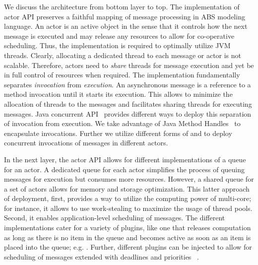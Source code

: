 We discuss the architecture from bottom layer to top.
The implementation of actor API preserves a faithful mapping of message processing in ABS modeling language.
An actor is an active object in the sense that it controls how the next message is executed and may release any resources to allow for co-operative scheduling.
Thus, the implementation is required to optimally utilize JVM threads.
Clearly, allocating a dedicated thread to each message or actor is not scalable.
Therefore, actors need to \emph{share} threads for message execution and yet be in full control of resources when required.
The implementation fundamentally separates \emph{invocation} from \emph{execution}.
An asynchronous message is a reference to a method invocation until it starts its execution.
This allows to minimize the allocation of threads to the messages and facilitates sharing threads for executing messages.
Java concurrent API~\cite{jsr166} provides different ways to deploy this separation of invocation from execution.
We take advantage of Java Method Handles~\cite{jsr292:invokedyn} to encapsulate invocations.
Further we utilize different forms of  and  to deploy concurrent invocations of messages in different actors.

In the next layer, the actor API allows for different implementations of a queue for an actor.
A dedicated queue for each actor simplifies the process of queuing messages for execution but consumes more resources.
However, a  shared queue for a set of actors allows for memory and storage optimization.
This latter approach of deployment, first, provides a way to utilize the computing power of multi-core; 
for instance, it allows to use work-stealing to maximize the usage of thread pools.
Second, it enables  application-level scheduling of messages.
The different implementations cater for a variety of plugins, like
one that releases computation as long as there is no item
in the queue and becomes active as soon as an item is placed into the queue; e.g. .
Further, different plugins can be injected to allow for scheduling of messages extended with deadlines and priorities
~\cite{Nobakht:sched}.


